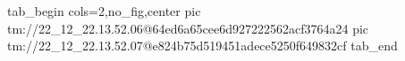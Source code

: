  
 
 
 
 

\qqSecOrig


\ifcmt
  tab_begin cols=2,no_fig,center
    pic tm://22_12_22.13.52.06@64ed6a65cee6d927222562acf3764a24
    pic tm://22_12_22.13.52.07@e824b75d519451adece5250f649832cf
  tab_end
\fi

